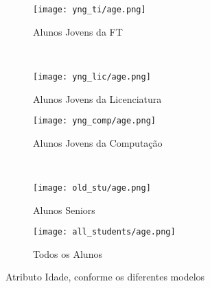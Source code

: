 \clearpage
\begin{figure}[!ht]
    \centering
    \begin{subfigure}[b]{0.48\textwidth}
        \centering
        \texttt{[image: yng\_ti/age.png]}
        \caption{Alunos Jovens da FT}
    \end{subfigure}
    ~
    \begin{subfigure}[b]{0.48\textwidth}
        \centering
        \texttt{[image: yng\_lic/age.png]}
        \caption{Alunos Jovens da Licenciatura}
    \end{subfigure}

    \begin{subfigure}[b]{0.48\textwidth}
        \centering
        \texttt{[image: yng\_comp/age.png]}
        \caption{Alunos Jovens da Computação}
    \end{subfigure}
    ~
    \begin{subfigure}[b]{0.48\textwidth}
        \centering
        \texttt{[image: old\_stu/age.png]}
        \caption{Alunos Seniors}
    \end{subfigure}

    \begin{subfigure}[b]{0.48\textwidth}
        \centering
        \texttt{[image: all\_students/age.png]}
        \caption{Todos os Alunos}
    \end{subfigure}
    \caption{Atributo Idade, conforme os diferentes modelos}
\end{figure}

